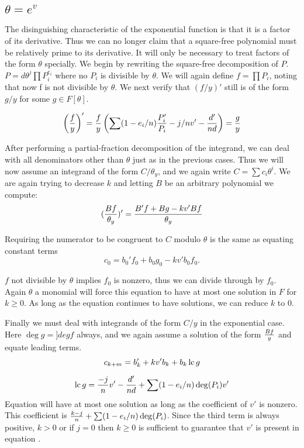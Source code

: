 \subsection{$\theta = e^v$}

The disinguishing characteristic of the exponential function is that
it is a factor of its derivative.  Thus we can no longer claim that
a square-free polynomial must be relatively prime to its derivative.
It will only be necessary to treat factors of the form $\theta$
specially.  We begin by rewriting the square-free decomposition of $P$.
$P = d \theta^j \prod P_i^{e_i}$  where no $P_i$
is divisible by $\theta$.  We will again define $f = \prod P_i$,
noting that now f is not divisible by $\theta$.  We next verify
that $(f/y)'$ still is of the form $g/y$ for some $g \in F[ \theta ]$.

\[
\left( {f \over y} \right)' = {f \over y} \left (
\sum (1-e_i /n) {P_i'
\over P_i} - j/n v' - {d' \over n d} \right ) = {g \over y}
\]


After performing a partial-fraction decomposition of the integrand, we
can deal with all denominators other than $\theta$ 
just as in the previous cases.  Thus we will now assume an integrand
of the form $C / {\theta_ y} $, and we again write $C = \sum 
c_i \theta^i$. We are again trying to decrease $k$ and letting
$B$ be an arbitrary polynomial we compute:
\[
({B f \over \theta_ y})' = {B' f + B g - k v' B f \over \theta_y}
\]

Requiring the numerator to be congruent to $C$ modulo $\theta$ is the
same as equating constant terms
\[
c_0 = b_0' f_0 + b_0 g_0 -k v' b_0 f_0.
\]

$f$ not divisible by $\theta$ implies $f_0 $ is nonzero, thus we can 
divide through by $f_0$.  Again $\theta$ a monomial will force
this equation to have at most one solution in $F$
for $k\ge 0$. As long as the
equation continues to have solutions, we can reduce $k$ to 0.

Finally we must deal with integrands of the form $C / y$ in the
exponential case.  Here $\deg g = ]deg f$ always, and we again assume
a solution of the form ${B f} \over y$ and equate leading terms.
\begin{equation}
c_{k+m} = b_k' + k v' b_k + b_k \operatorname{lc} g
\label{Simple:Int:Alg:Eq:e}
\end{equation}

\[
\operatorname{lc} g = {-j \over n} v' - {d' \over n d} + \sum (1-e_i /n) \deg(P_i ) v'
\]
Equation  will have at most one solution
as long as the coefficient of $v'$ is nonzero. 
This coefficient is ${k - j \over n} + \sum (1-e_i / n) \deg(P_i )$.
Since the third term is always positive, $k > 0$ or if $j = 0$ then
$k\ge0$ is sufficient to guarantee that $v'$ is present in
equation .

